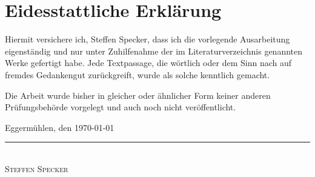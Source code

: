 \thispagestyle{empty}

\section*{Eidesstattliche Erklärung}
Hiermit versichere ich, Steffen Specker, dass ich die vorlegende Ausarbeitung eigenständig und nur unter Zuhilfenahme der im Literaturverzeichnis genannten Werke gefertigt habe. Jede Textpassage, die wörtlich oder dem Sinn nach auf fremdes Gedankengut zurückgreift, wurde als solche kenntlich gemacht.\par

Die Arbeit wurde bisher in gleicher oder ähnlicher Form keiner anderen Prüfungsbehörde vorgelegt und auch noch nicht veröffentlicht.

\bigskip
\bigskip

Eggermühlen, den \today

\bigskip

\rule[-0.2cm]{5cm}{0.5pt}\\
\textsc{Steffen Specker} 


%
